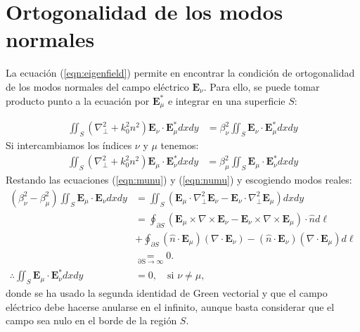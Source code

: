 \chapter{Ortogonalidad de los modos normales \label{sec:orto}}

La ecuación (\ref{eqn:eigenfield}) permite en encontrar la condición de ortogonalidad de los modos normales del campo eléctrico  $\textbf{E}_\nu$. Para ello, se puede tomar producto punto a la ecuación por $\textbf{E}_\mu^*$ e integrar en una superficie $S$:

\begin{align}
	 \iint_S \left(  \nabla_\perp^2  + k_0^2n^2 \right)\textbf{E}_\nu \cdot\textbf{E}_\mu^* dxdy &= \beta_\nu^2 \iint_S \textbf{E}_\nu \cdot\textbf{E}_\mu^* dxdy \label{eqn:munu}
\end{align}
Si intercambiamos los índices $\nu$ y $\mu$ tenemos:
\begin{align}
	 	\iint_S \left(  \nabla_\perp^2  + k_0^2n^2 \right)\textbf{E}_\mu \cdot\textbf{E}_\nu^* dxdy &= \beta_\mu^2 \iint_S \textbf{E}_\mu \cdot\textbf{E}_\nu^* dxdy \label{eqn:numu}
\end{align}
Restando las ecuaciones (\ref{eqn:munu}) y (\ref{eqn:numu}) y escogiendo modos reales:
\begin{align*}
	 	  (\beta_\nu^2-\beta_\mu^2)\iint_S\textbf{E}_\mu \cdot\textbf{E}_\nu dxdy &=  \iint_S \left(\textbf{E}_\mu   \cdot\nabla_\perp^2 \textbf{E}_\nu - \textbf{E}_\nu   \cdot\nabla_\perp^2 \textbf{E}_\mu\right)  dxdy
		\nonumber	 	  
	 	  \\
	 	  &=
	 	  \oint_{\partial S} (\textbf{E}_\mu \times \nabla \times \textbf{E}_\nu - \textbf{E}_\nu \times \nabla \times \textbf{E}_\mu) \cdot \hat{n}d\ell
	 	  \nonumber
			\\	 	  
	 	  &+
	 	  \oint_{\partial S} (\hat{n}\cdot \textbf{E}_\mu)(\nabla\cdot \textbf{E}_\nu) - (\hat{n}\cdot \textbf{E}_\nu)(\nabla\cdot \textbf{E}_\mu) d\ell
	 	  \nonumber
	 	  \\
	 	  &\underset{\mathrm{\partial S \to \infty}}{=}  0.
	 	 \\
	 	 \therefore \iint_S\textbf{E}_\mu \cdot\textbf{E}_\nu^* dxdy &= 0, \quad \text{si } \nu\neq\mu,
\end{align*}
donde se ha usado la segunda identidad de Green vectorial \citep{greenvectorial} y que el campo eléctrico debe hacerse anularse en el infinito, aunque basta considerar que el campo sea nulo en el borde de la región $S$.